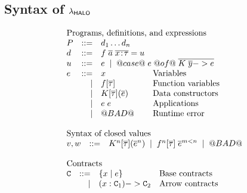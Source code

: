 \documentclass[preprint]{sigplanconf}
\begin{document}
\subsection{Syntax of $\lambda_{\sf HALO}$} \label{s:syntax}

\begin{figure}
\[\begin{array}{l}
\begin{array}{lrll}
\multicolumn{4}{l}{\text{Programs, definitions, and expressions}} \\
P   & ::= & d_1 \ldots d_n \\
d   & ::= & f\; \ol{a} \; \ol{x\!:\!\tau} = u \\
u   & ::= & \multicolumn{2}{l}{e \; \mid \; @case@\;e\;@of@\;\ol{K\;\ol{y} -> e}} \\
e  & ::=  & x            & \text{Variables} \\
   & \mid & f[\ol{\tau}] & \text{Function variables} \\
   & \mid & K[\ol{\tau}](\ol{e}) & \text{Data constructors} \\
   & \mid & e\;e         & \text{Applications} \\
   & \mid & @BAD@        & \text{Runtime error} \\
\end{array}\\ \\
\begin{array}{lrll}
\multicolumn{3}{l}{\text{Syntax of closed values}} \\
 v,w & ::= & K^\ar[\ol{\tau}](\oln{e}{\ar}) \;\mid\; f^\ar[\ol{\tau}]\;\oln{e}{m < \ar}\;\mid\;@BAD@ \\ \\
\end{array}
\\
\begin{array}{lrll}
\multicolumn{3}{l}{\text{Contracts}} \\
 \Ct & ::=  & \{ x \mid e \}        & \text{Base contracts}  \\
     & \mid &  (x : \Ct_1) -> \Ct_2      & \text{Arrow contracts} \\
\end{array}
\\ \\
\begin{array}{lrll}

\end{array}
\end{array}\]
\end{figure}
\end{document}
